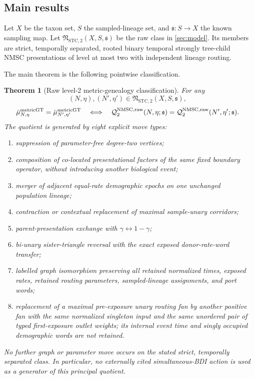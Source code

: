 \documentclass[11pt]{article}
\newtheorem{theorem}{Theorem}[section]
\newcommand{\Qraw}{\mathcal Q^{\mathrm{NMSC,raw}}_2}
\newcommand{\Ncal}{\mathfrak N}
\begin{document}
\subsection{Main results}
Let $X$ be the taxon set, $S$ the sampled-lineage set, and $\mathfrak s:S\to X$ the known sampling map.  Let $\Ncal_{\mathrm{STC},2}(X,S,\mathfrak s)$ be the raw class in \cref{sec:model}.  Its members are strict, temporally separated, rooted binary temporal strongly tree-child NMSC presentations of level at most two with independent lineage routing.

The main theorem is the following pointwise classification.

\begin{theorem}[Raw level-2 metric-genealogy classification]
\label{thm:main}
For any
\[
 (N,\eta),(N',\eta')\in\Ncal_{\mathrm{STC},2}(X,S,\mathfrak s),
\]
\begin{equation}
 \bar\mu^{\rm metricGT}_{N,\eta}=\bar\mu^{\rm metricGT}_{N',\eta'}
 \quad\Longleftrightarrow\quad
 \Qraw(N,\eta;\mathfrak s)=\Qraw(N',\eta';\mathfrak s).
 \label{eq:headline}
\end{equation}
The quotient is generated by eight explicit move types:
\begin{enumerate}[label=\textup{(Q\arabic*)}]
\item suppression of parameter-free degree-two vertices;
\item composition of co-located presentational factors of the same fixed boundary operator, without introducing another biological event;
\item merger of adjacent equal-rate demographic epochs on one unchanged population lineage;
\item contraction or contextual replacement of maximal sample-unary corridors;
\item parent-presentation exchange with $\gamma\leftrightarrow1-\gamma$;
\item bi-unary sister-triangle reversal with the exact exposed donor-rate-word transfer;
\item labelled graph isomorphism preserving all retained normalized times, exposed rates, retained routing parameters, sampled-lineage assignments, and port words;
\item replacement of a maximal pre-exposure unary routing fan by another positive fan with the same normalized singleton input and the same unordered pair of typed first-exposure outlet weights; its internal event time and singly occupied demographic words are not retained.
\end{enumerate}
No further graph or parameter move occurs on the stated strict, temporally separated class.  In particular, no externally cited simultaneous-BDI action is used as a generator of this principal quotient.
\end{theorem}
\end{document}
